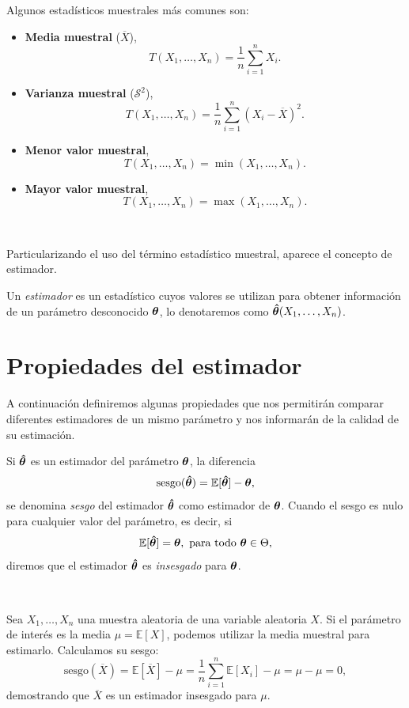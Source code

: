 \documentclass[oneside,openright,titlepage,numbers=noenddot,openany,headinclude,footinclude=true,
cleardoublepage=empty,abstractoff,BCOR=5mm,paper=a4,fontsize=12pt,main=spanish]{scrreprt}
\begin{document}
\begin{example}
Algunos estadísticos muestrales más comunes son:
\begin{itemize}
    \item \textbf{Media muestral} ($\overline{X}$), $$ T(X_1,\dots,X_n)=\frac{1}{n}\sum_{i=1}^n X_i.$$
    \item \textbf{Varianza muestral} ($\mathcal{S}^2$),  $$ T(X_1,\dots,X_n)=\frac{1}{n}\sum_{i=1}^n (X_i-\overline{X})^2.$$
    \item \textbf{Menor valor muestral}, $$ T(X_1,\dots,X_n)=\min (X_1,\dots,X_n).$$
    \item \textbf{Mayor valor muestral},  $$ T(X_1,\dots,X_n)=\max (X_1,\dots,X_n).$$
\end{itemize}
\end{example}\

Particularizando el uso del término estadístico muestral, aparece el concepto de estimador.\\

\begin{definition}[Estimador]
Un \textit{estimador} es un estadístico cuyos valores se utilizan para obtener información de un parámetro desconocido $\bm{\theta}$, lo denotaremos como $\bm{\hat{\theta}} (X_1,\dots,X_n)$.
\end{definition}

\section{Propiedades del estimador}

A continuación definiremos algunas propiedades que nos permitirán comparar diferentes estimadores de un mismo parámetro y nos informarán de la calidad de su estimación.\\

\begin{definition}
Si $\bm{\hat{\theta}}$ es un estimador del parámetro $\bm{\theta}$, la diferencia $$\text{sesgo}(\bm{\hat{\theta}})=\mathbb{E}[\bm{\hat{\theta}}]-\bm{\theta},$$
se denomina \textit{sesgo} del estimador $\bm{\hat{\theta}}$ como estimador de $\bm{\theta}$. Cuando el sesgo es nulo para cualquier valor del parámetro, es decir, si $$\mathbb{E}[\htheta]=\btheta, \ \text{para todo} \ \btheta \in \Theta,$$
diremos que el estimador $\bm{\hat{\theta}}$ es \textit{insesgado} para $\bm{\theta}$.
\end{definition}\

\begin{example} \label{ex:sesgonul}
Sea $X_1,\dots,X_n$ una muestra aleatoria de una variable aleatoria $X$. Si el parámetro de interés es la media $\mu=\mathbb{E}[X]$, podemos utilizar la media muestral para estimarlo. Calculamos su sesgo: $$\text{sesgo}(\overline{X})=\mathbb{E}[\overline{X}]-\mu=\frac{1}{n}\sum_{i=1}^n \mathbb{E}[X_i]-\mu=\mu-\mu=0,$$
demostrando que $\overline{X}$ es un estimador insesgado para $\mu$.
\end{example}\
\end{document}
